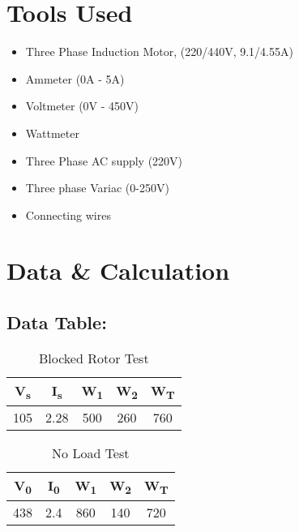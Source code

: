 \documentclass[12pt]{article}
\begin{document}
\section{Tools Used}
\begin{itemize}
    \item Three Phase Induction Motor, (220/440V, 9.1/4.55A)
    \item Ammeter (0A - 5A)
    \item Voltmeter (0V - 450V)
    \item Wattmeter
    \item Three Phase AC supply (220V)
    \item Three phase Variac (0-250V)
    \item Connecting wires
\end{itemize}

\section{Data \& Calculation}
\subsection{Data Table:}
\begin{table}[H]
    \centering
    \caption{Blocked Rotor Test}
    \begin{tabular}{|c|c|c|c|c|}
        \hline
        \bf{V\textsubscript{s}} & \bf{I\textsubscript{s}} & \bf{W\textsubscript{1}} & \bf{W\textsubscript{2}} & \bf{W\textsubscript{T}} \\
        \hline
        105                     & 2.28                    & 500                     & 260                     & 760                     \\
        \hline
    \end{tabular}
\end{table}
\begin{table}[H]
    \centering
    \caption{No Load Test}
    \begin{tabular}{|c|c|c|c|c|}
        \hline
        \bf{V\textsubscript{0}} & \bf{I\textsubscript{0}} & \bf{W\textsubscript{1}} & \bf{W\textsubscript{2}} & \bf{W\textsubscript{T}} \\
        \hline
        438                     & 2.4                     & 860                     & 140                     & 720                     \\
        \hline
    \end{tabular}
\end{table}
\end{document}
